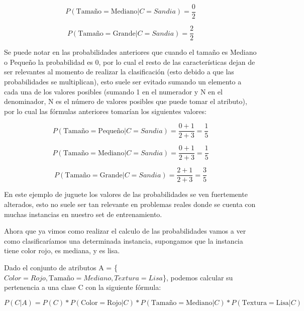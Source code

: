 \documentclass[11pt,fleqn]{book} %
\begin{document}
\begin{equation}
P(\text{Tamaño}=\text{Mediano} | C=Sandia) = \frac{0}{2}
\label{eqn:tamMedSandia} 
\end{equation}

\begin{equation}
P(\text{Tamaño}=\text{Grande} | C=Sandia) = \frac{2}{2}
\label{eqn:tamGraSandia} 
\end{equation}

Se puede notar en las probabilidades anteriores que cuando el tamaño es Mediano o Pequeño la probabilidad es 0, por lo cual el resto de las características dejan de ser relevantes al momento de realizar la clasificación (esto debido a que las probabilidades se multiplican), esto suele ser evitado sumando un elemento a cada una de los valores posibles (sumando 1 en el numerador y N en el denominador, N es el número de valores posibles que puede tomar el atributo), por lo cual las fórmulas anteriores tomarían los siguientes valores:

\begin{equation}
P(\text{Tamaño}=\text{Pequeño} | C=Sandia) = \frac{0+1}{2+3} = \frac{1}{5}
\label{eqn:tamPeqSandia2} 
\end{equation}

\begin{equation}
P(\text{Tamaño}=\text{Mediano} | C=Sandia) = \frac{0+1}{2+3} = \frac{1}{5}
\label{eqn:tamMedSandia2} 
\end{equation}

\begin{equation}
P(\text{Tamaño}=\text{Grande} | C=Sandia) = \frac{2+1}{2+3} = \frac{3}{5}
\label{eqn:tamGraSandia2} 
\end{equation}

En este ejemplo de juguete los valores de las probabilidades se ven fuertemente alterados, esto no suele ser tan relevante en problemas reales donde se cuenta con muchas instancias en nuestro set de entrenamiento.

Ahora que ya vimos como realizar el calculo de las probabilidades vamos a ver como clasificaríamos una determinada instancia, supongamos que la instancia tiene color rojo, es mediana, y es lisa.

Dado el conjunto de atributos A = \{$Color = Rojo, \text{Tamaño} = Mediano, Textura=Lisa$\}, podemos calcular su pertenencia a una clase C con la siguiente fórmula:

\begin{equation}
P(C|A) = P(C)*P(\text{Color}=\text{Rojo} | C)*P(\text{Tamaño}=\text{Mediano} | C)*P(\text{Textura}=\text{Lisa} | C)
\label{eqn:clasificadorEjemplo} 
\end{equation}
\end{document}
